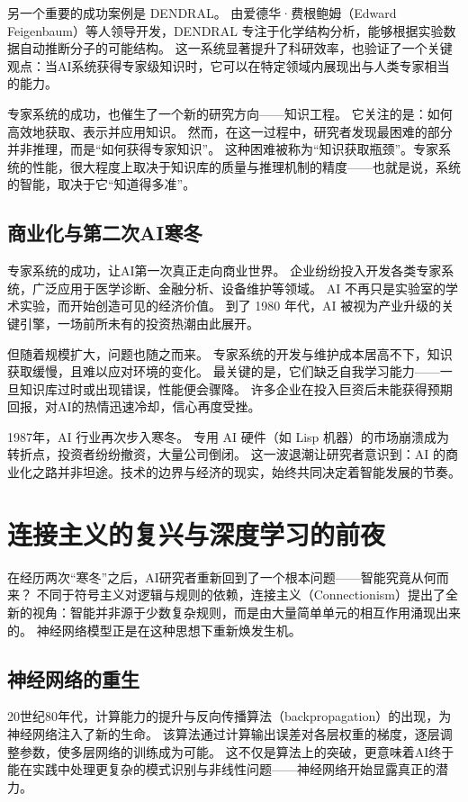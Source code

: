 另一个重要的成功案例是 DENDRAL。  
由爱德华·费根鲍姆（Edward Feigenbaum）等人领导开发，DENDRAL 专注于化学结构分析，能够根据实验数据自动推断分子的可能结构。  
这一系统显著提升了科研效率，也验证了一个关键观点：当AI系统获得专家级知识时，它可以在特定领域内展现出与人类专家相当的能力。

专家系统的成功，也催生了一个新的研究方向——知识工程。  
它关注的是：如何高效地获取、表示并应用知识。  
然而，在这一过程中，研究者发现最困难的部分并非推理，而是“如何获得专家知识”。  
这种困难被称为“知识获取瓶颈”。专家系统的性能，很大程度上取决于知识库的质量与推理机制的精度——也就是说，系统的智能，取决于它“知道得多准”。

\subsection{商业化与第二次AI寒冬}

专家系统的成功，让AI第一次真正走向商业世界。  
企业纷纷投入开发各类专家系统，广泛应用于医学诊断、金融分析、设备维护等领域。  
AI 不再只是实验室的学术实验，而开始创造可见的经济价值。  
到了 1980 年代，AI 被视为产业升级的关键引擎，一场前所未有的投资热潮由此展开。

但随着规模扩大，问题也随之而来。  
专家系统的开发与维护成本居高不下，知识获取缓慢，且难以应对环境的变化。  
最关键的是，它们缺乏自我学习能力——一旦知识库过时或出现错误，性能便会骤降。  
许多企业在投入巨资后未能获得预期回报，对AI的热情迅速冷却，信心再度受挫。

1987年，AI 行业再次步入寒冬。  
专用 AI 硬件（如 Lisp 机器）的市场崩溃成为转折点，投资者纷纷撤资，大量公司倒闭。  
这一波退潮让研究者意识到：AI 的商业化之路并非坦途。技术的边界与经济的现实，始终共同决定着智能发展的节奏。

\section{连接主义的复兴与深度学习的前夜}

在经历两次“寒冬”之后，AI研究者重新回到了一个根本问题——智能究竟从何而来？  
不同于符号主义对逻辑与规则的依赖，连接主义（Connectionism）提出了全新的视角：智能并非源于少数复杂规则，而是由大量简单单元的相互作用涌现出来的。  
神经网络模型正是在这种思想下重新焕发生机。

\subsection{神经网络的重生}

20世纪80年代，计算能力的提升与反向传播算法（backpropagation）的出现，为神经网络注入了新的生命。  
该算法通过计算输出误差对各层权重的梯度，逐层调整参数，使多层网络的训练成为可能。  
这不仅是算法上的突破，更意味着AI终于能在实践中处理更复杂的模式识别与非线性问题——神经网络开始显露真正的潜力。

